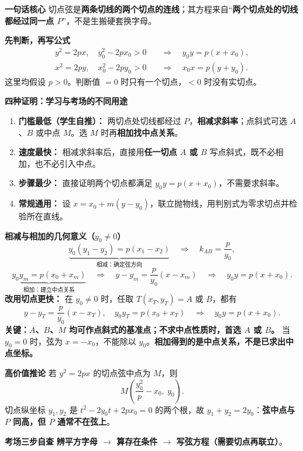 \begin{summarybox}
\textbf{\textcolor{CSummary}{一句话核心}}
切点弦是\textbf{两条切线的两个切点的连线}；其方程来自“\textbf{两个切点处的切线都经过同一点 $P$}”，不是生搬硬套换字母。

\medskip
\textbf{\textcolor{CSummary}{先判断，再写公式}}
\[
\begin{aligned}
 y^2=2px,\quad y_0^2-2px_0>0
 &\quad\Longrightarrow\quad \boxed{y_0y=p(x+x_0)},\\[0.4em]
 x^2=2py,\quad x_0^2-2py_0>0
 &\quad\Longrightarrow\quad \boxed{x_0x=p(y+y_0)}.
\end{aligned}
\]
这里均假设 $p>0$。判断值 $=0$ 时只有一个切点，$<0$ 时没有实切点。

\medskip
\textbf{\textcolor{CSummary}{四种证明：学习与考场的不同用途}}
\begin{enumerate}[leftmargin=*,itemsep=0.3em]
\item \textbf{门槛最低（学生自推）：} 两切点处切线都经过 $P$，\textbf{相减求斜率}；点斜式可选 $A$、$B$ 或中点 $M$。选 $M$ 时再\textbf{相加找中点关系}。
\item \textbf{速度最快：} 相减求斜率后，直接用\textbf{任一切点 $A$ 或 $B$} 写点斜式，既不必相加，也不必引入中点。
\item \textbf{步骤最少：} 直接证明两个切点都满足 $y_0y=p(x+x_0)$，不需要求斜率。
\item \textbf{常规通用：} 设 $x=x_0+m(y-y_0)$，联立抛物线，用判别式为零求切点并检验所在直线。
\end{enumerate}

\textbf{相减与相加的几何意义（$y_0\ne0$）}
\[
 \underbrace{y_0(y_1-y_2)=p(x_1-x_2)}_{\text{相减：确定弦方向}}
 \quad\Rightarrow\quad k_{AB}=\frac p{y_0},
\]
\[
 \underbrace{y_0y_m=p(x_0+x_m)}_{\text{相加：建立中点关系}}
 \quad\Rightarrow\quad
 y-y_m=\frac p{y_0}(x-x_m)
 \quad\Rightarrow\quad y_0y=p(x+x_0).
\]
\textbf{改用切点更快：} 在 $y_0\ne0$ 时，任取 $T(x_T,y_T)=A$ 或 $B$，都有
\[
 y-y_T=\frac p{y_0}(x-x_T),\quad y_0y_T=p(x_0+x_T)
 \quad\Longrightarrow\quad \boxed{y_0y=p(x+x_0)}.
\]
\textbf{关键：$A$、$B$、$M$ 均可作点斜式的基准点；不求中点性质时，首选 $A$ 或 $B$。} 当 $y_0=0$ 时，弦为 $x=-x_0$，不能除以 $y_0$。\textbf{相加得到的是中点关系，不是已求出中点坐标。}

\medskip
\textbf{\textcolor{CSummary}{高价值推论}}
若 $y^2=2px$ 的切点弦中点为 $M$，则
\[\boxed{M\left(\frac{y_0^2}{p}-x_0,\ y_0\right)}.\]
切点纵坐标 $y_1,y_2$ 是 $t^2-2y_0t+2px_0=0$ 的两个根，故 $y_1+y_2=2y_0$：\textbf{弦中点与 $P$ 同高，但 $P$ 通常不在弦上}。

\medskip
\textbf{\textcolor{CSummary}{考场三步自查}}
\textbf{辨平方字母 $\to$ 算存在条件 $\to$ 写弦方程（需要切点再联立）}。
\end{summarybox}
